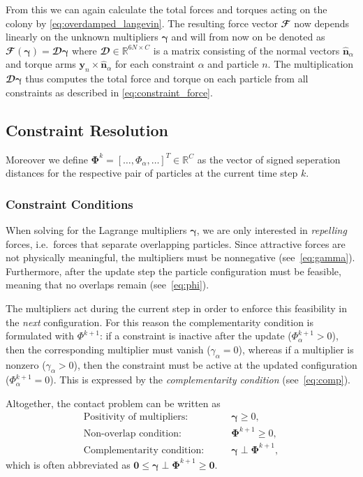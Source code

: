 \documentclass[conference]{IEEEtran}
\begin{document}
From this we can again calculate the total forces and torques acting on the colony by \autoref{eq:overdamped_langevin}. The resulting force vector $\mathbfcal{F}$ now depends linearly on the unknown multipliers $\boldsymbol{\gamma}$ and will from now on be denoted as $\mathbfcal{F}(\boldsymbol{\gamma}) = \mathbfcal{D}\boldsymbol{\gamma}$ where $\mathbfcal{D} \in \mathbb{R}^{6N \times C}$ is a matrix consisting of the normal vectors $\hat{\mathbf{n}}_\alpha$ and torque arms $\mathbf{y}_n \times \hat{\mathbf{n}}_\alpha$ for each constraint $\alpha$ and particle $n$. The multiplication $\mathbfcal{D}\boldsymbol{\gamma}$ thus computes the total force and torque on each particle from all constraints as described in \autoref{eq:constraint_force}.

\subsection{Constraint Resolution}

Moreover we define $\mathbf{\Phi}^k = [\dots, \Phi_\alpha, \dots]^T \in \mathbb{R}^{C}$ as the vector of signed seperation distances for the respective pair of particles at the current time step $k$.

\subsubsection{Constraint Conditions}

When solving for the Lagrange multipliers $\boldsymbol{\gamma}$, we are only interested in \emph{repelling} forces, i.e.\ forces that separate overlapping particles.
Since attractive forces are not physically meaningful, the multipliers must be nonnegative (see~\autoref{eq:gamma}).
Furthermore, after the update step the particle configuration must be feasible, meaning that no overlaps remain (see~\autoref{eq:phi}).

The multipliers act during the current step in order to enforce this feasibility in the \emph{next} configuration.
For this reason the complementarity condition is formulated with $\Phi^{k+1}$: if a constraint is inactive after the update ($\Phi_\alpha^{k+1} > 0$), then the corresponding multiplier must vanish ($\gamma_\alpha = 0$), whereas if a multiplier is nonzero ($\gamma_\alpha > 0$), then the constraint must be active at the updated configuration ($\Phi_\alpha^{k+1} = 0$).
This is expressed by the \emph{complementarity condition} (see~\autoref{eq:comp}).

Altogether, the contact problem can be written as
\begin{align}
    \text{Positivity of multipliers:} \qquad & \boldsymbol{\gamma} \geq 0, \label{eq:gamma}                   \\
    \text{Non-overlap condition:} \qquad     & \mathbf{\Phi}^{k+1} \geq 0, \label{eq:phi}                     \\
    \text{Complementarity condition:} \qquad & \boldsymbol{\gamma} \perp \mathbf{\Phi}^{k+1}, \label{eq:comp}
\end{align}
which is often abbreviated as $\mathbf{0} \leq \boldsymbol{\gamma} \perp \mathbf{\Phi}^{k+1} \geq \mathbf{0}$.
\end{document}
